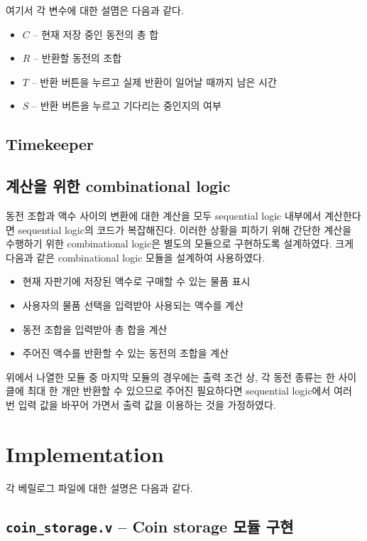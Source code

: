 \documentclass{scrartcl}
\begin{document}
여기서 각 변수에 대한 설몀은 다음과 같다.

\begin{itemize}
  \item \(C\) -- 현재 저장 중인 동전의 총 합
  \item \(R\) -- 반환할 동전의 조합
  \item \(T\) -- 반환 버튼을 누르고 실제 반환이 일어날 때까지 남은 시간
  \item \(S\) -- 반환 버튼을 누르고 기다리는 중인지의 여부
\end{itemize}

\subsection{Timekeeper}

\subsection{계산을 위한 combinational logic}
동전 조합과 액수 사이의 변환에 대한 계산을 모두 sequential logic 내부에서 계산한다면 sequential logic의 코드가
복잡해진다. 이러한 상황을 피하기 위해 간단한 계산을 수행하기 위한 combinational logic은 별도의 모듈으로 구현하도록
설계하였다. 크게 다음과 같은 combinational logic 모듈을 설계하여 사용하였다.

\begin{itemize}
  \item 현재 자판기에 저장된 액수로 구매할 수 있는 물품 표시
  \item 사용자의 물품 선택을 입력받아 사용되는 액수를 계산
  \item 동전 조합을 입력받아 총 합을 계산
  \item 주어진 액수를 반환할 수 있는 동전의 조합을 계산
\end{itemize}

위에서 나열한 모듈 중 마지막 모듈의 경우에는 출력 조건 상, 각 동전 종류는 한 사이클에 최대 한 개만 반환할 수 있으므로 주어진 필요하다면
sequential logic에서 여러 번 입력 값을 바꾸어 가면서 출력 값을 이용하는 것을 가정하였다.

\section{Implementation}
각 베릴로그 파일에 대한 설명은 다음과 같다.

\subsection{\texttt{coin\_storage.v} -- Coin storage 모듈 구현}
\end{document}
